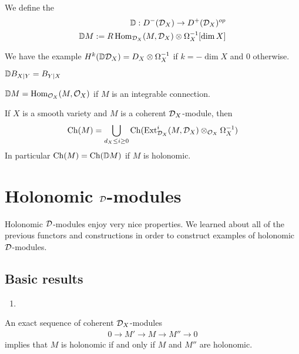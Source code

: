 \begin{definition} We define the 
	\begin{align*}
		\mathbb{D}: D^-({\mathcal{D}}_X) \to D^+({\mathcal{D}}_X)^{op} \\
		\mathbb{D} M := R\operatorname{Hom}_{{\mathcal{D}}_X}(M,{\mathcal{D}}_X) \otimes \Omega_X^{-1}[\dim X]
	\end{align*}
\end{definition}
\begin{example}
	We have the example $H^k(\mathbb{D} {\mathcal{D}}_X) = D_X\otimes \Omega_X^{-1}$ if $k = -\dim X$ and $0$ otherwise.
\end{example}
\begin{example}
	$ \mathbb{D} B_{X\vert Y} = B_{Y\vert X}$
\end{example}
\begin{example}
	$\mathbb{D} M = \operatorname{Hom}_{{\mathcal{O}}_X}(M,{\mathcal{O}}_X)$ if $M$ is an integrable connection.
\end{example}
\begin{proposition}
	If $X$ is a smooth variety and $M$ is a coherent ${\mathcal{D}}_X$-module, then \begin{align*}
		\operatorname{Ch}(M) = \bigcup_{d_X\leq i\geq 0} \operatorname{Ch}(\operatorname{Ext}^i_{{\mathcal{D}}_X}(M,{\mathcal{D}}_X)\otimes_{{\mathcal{O}}_X}\Omega_X^{-1})
	\end{align*} In particular $\operatorname{Ch}(M) = \operatorname{Ch}(\mathbb{D} M)$ if $M$ is holonomic.
\end{proposition}

\section{Holonomic ${\mathcal{D}}$-modules}
Holonomic ${\mathcal{D}}$-modules enjoy very nice properties. We learned about all of the
previous functors and constructions in order to construct examples of holonomic ${\mathcal{D}}$-modules.

\subsection{Basic results}
\begin{proposition}
	\begin{enumerate}
		\item
	\end{enumerate}
	An exact sequence of coherent ${\mathcal{D}}_X$-modules \begin{align*}
		0 \to M' \to M \to M'' \to 0
	\end{align*} implies that $M$ is holonomic if and only if $M$ and $M''$ are holonomic.
\end{proposition}

